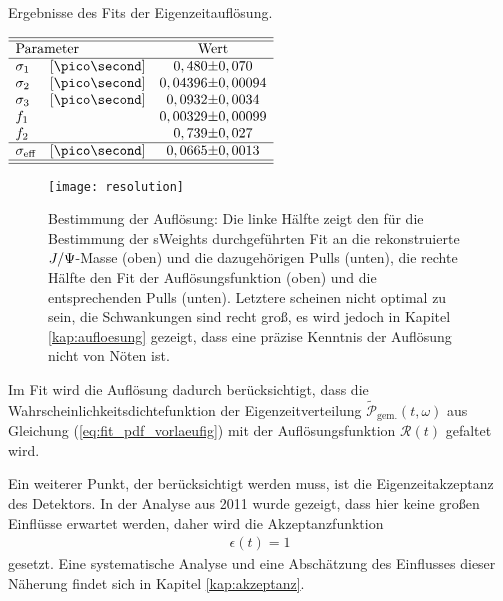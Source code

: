 \begin{table}[hptb]
\centering
\caption{Ergebnisse des Fits der Eigenzeitauflösung.}
\label{tab:resolution}
$\begin{array}{ll r@{\pm}l}
\hline 
\hline
\multicolumn{2}{l}{\text{Parameter}} & \multicolumn{2}{c}{\text{Wert}}\\
\hline
\sigma_{1}& [\ps] & 0,480 & 0,070 \\
\sigma_{2}& [\ps] & 0,04396 & 0,00094 \\
\sigma_{3}& [\ps] & 0,0932 & 0,0034 \\
f_{1} & & 0,00329 & 0,00099\\
f_{2} & & 0,739 & 0,027\\ \hline
\sigma_{\text{eff}}& [\ps] & 0,0665 & 0,0013 \\ \hline \hline
\end{array}$   
\end{table}
\begin{figure}[hptb]
\centering
\texttt{[image: resolution]}
\caption{Bestimmung der Auflösung: Die linke Hälfte zeigt den für die Bestimmung der sWeights durchgeführten Fit an die rekonstruierte $J/\Psi$-Masse (oben) und die dazugehörigen Pulls (unten), die rechte Hälfte den Fit der Auflösungsfunktion (oben) und die entsprechenden Pulls (unten). Letztere scheinen nicht optimal zu sein, die Schwankungen sind recht groß, es wird jedoch in Kapitel \ref{kap:aufloesung} gezeigt, dass eine präzise Kenntnis der Auflösung nicht von Nöten ist.}
\label{fig:resolution}
\end{figure}
Im Fit wird die Auflösung dadurch berücksichtigt, dass die Wahrscheinlichkeitsdichtefunktion der Eigenzeitverteilung $\widetilde{\mathcal{P}}_{\text{gem.}}(t, \omega)$ aus Gleichung (\ref{eq:fit_pdf_vorlaeufig}) mit der Auflösungsfunktion $\mathcal{R}(t)$ gefaltet wird. 

Ein weiterer Punkt, der berücksichtigt werden muss, ist die Eigenzeitakzeptanz des Detektors. In der Analyse aus 2011 \cite{lhcb-paper} wurde gezeigt, dass hier keine großen Einflüsse erwartet werden, daher wird die Akzeptanzfunktion 
\begin{align}
\epsilon(t) = 1
\end{align}
gesetzt. Eine systematische Analyse und eine Abschätzung des Einflusses dieser Näherung findet sich in Kapitel \ref{kap:akzeptanz}.

